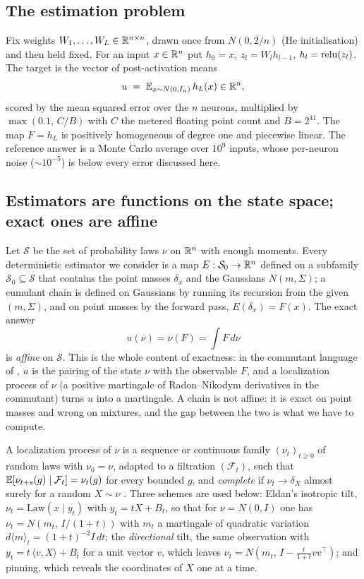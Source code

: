 \subsection{The estimation problem}
Fix weights $W_1,\dots,W_L\in\mathbb R^{n\times n}$, drawn once from $N(0,2/n)$ (He initialisation) and then held fixed. For an
input $x\in\mathbb R^n$ put $h_0=x$, $z_l=W_l h_{l-1}$, $h_l=\operatorname{relu}(z_l)$. The target is the vector of post-activation means
\[
u\;=\;\mathbb E_{x\sim N(0,I_n)}\,h_L(x)\in\mathbb R^n ,
\]
scored by the mean squared error over the $n$ neurons, multiplied by $\max(0.1,\,C/B)$ with $C$ the metered floating
point count and $B=2^{41}$. The map $F=h_L$ is positively homogeneous of degree one and piecewise linear. The reference
answer is a Monte Carlo average over $10^9$ inputs, whose per-neuron noise ($\sim10^{-5}$) is below every error
discussed here.

\subsection{Estimators are functions on the state space; exact ones are affine}
Let $\mathcal S$ be the set of probability laws $\nu$ on $\mathbb R^n$ with enough moments. Every deterministic estimator we
consider is a map $E:\mathcal S_0\to\mathbb R^n$ defined on a subfamily $\mathcal S_0\subseteq\mathcal S$ that contains the point
masses $\delta_x$ and the Gaussians $N(m,\Sigma)$; a cumulant chain is defined on Gaussians by running its recursion
from the given $(m,\Sigma)$, and on point masses by the forward pass, $E(\delta_x)=F(x)$. The exact answer
\[
u(\nu)=\nu(F)=\int F\,d\nu
\]
is \emph{affine} on $\mathcal S$. This is the whole content of exactness: in the commutant language of \cite{stage8},
$u$ is the pairing of the state $\nu$ with the observable $F$, and a localization process of $\nu$ (a positive
martingale of Radon--Nikodym derivatives in the commutant) turns $u$ into a martingale. A chain is not affine: it is
exact on point masses and wrong on mixtures, and the gap between the two is what we have to compute.

\begin{definition}
A localization process of $\nu$ is a sequence or continuous family $(\nu_t)_{t\ge0}$ of random laws with $\nu_0=\nu$,
adapted to a filtration $(\mathcal F_t)$, such that $\mathbb E[\nu_{t+s}(g)\mid\mathcal F_t]=\nu_t(g)$ for every bounded $g$,
and \emph{complete} if $\nu_t\to\delta_X$ almost surely for a random $X\sim\nu$ \cite{CE,stage8}. Three schemes are used
below: Eldan's isotropic tilt, $\nu_t=\mathrm{Law}(x\mid y_t)$ with $y_t=tX+B_t$, so that for $\nu=N(0,I)$ one has
$\nu_t=N(m_t,\,I/(1+t))$ with $m_t$ a martingale of quadratic variation $d\langle m\rangle_t=(1+t)^{-2}I\,dt$; the
\emph{directional} tilt, the same observation with $y_t=t\,\langle v,X\rangle+B_t$ for a unit vector $v$, which leaves
$\nu_t=N(m_t,\,I-\tfrac{t}{1+t}vv^{\top})$; and pinning, which reveals the coordinates of $X$ one at a time.
\end{definition}


